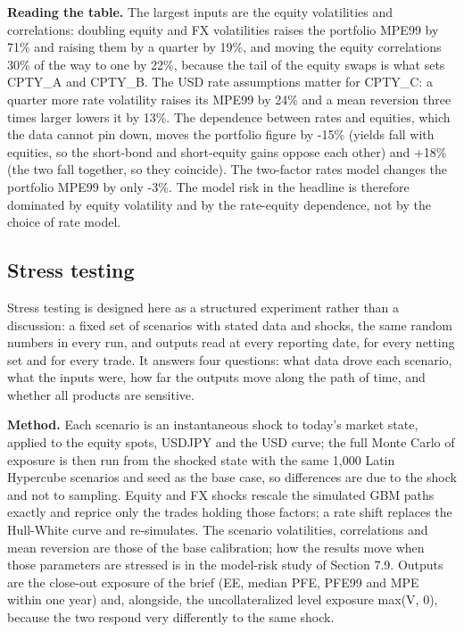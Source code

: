 \documentclass[11pt,letterpaper]{article}
\begin{document}
\textbf{Reading the table.} The largest inputs are the equity volatilities and correlations: doubling equity and FX volatilities raises the portfolio MPE99 by 71\% and raising them by a quarter by 19\%, and moving the equity correlations 30\% of the way to one by 22\%, because the tail of the equity swaps is what sets CPTY\_A and CPTY\_B. The USD rate assumptions matter for CPTY\_C: a quarter more rate volatility raises its MPE99 by 24\% and a mean reversion three times larger lowers it by 13\%. The dependence between rates and equities, which the data cannot pin down, moves the portfolio figure by -15\% (yields fall with equities, so the short-bond and short-equity gains oppose each other) and +18\% (the two fall together, so they coincide). The two-factor rates model changes the portfolio MPE99 by only -3\%. The model risk in the headline is therefore dominated by equity volatility and by the rate-equity dependence, not by the choice of rate model.

\subsection{Stress testing}
Stress testing is designed here as a structured experiment rather than a discussion: a fixed set of scenarios with stated data and shocks, the same random numbers in every run, and outputs read at every reporting date, for every netting set and for every trade. It answers four questions: what data drove each scenario, what the inputs were, how far the outputs move along the path of time, and whether all products are sensitive.

\textbf{Method.} Each scenario is an instantaneous shock to today's market state, applied to the equity spots, USDJPY and the USD curve; the full Monte Carlo of exposure is then run from the shocked state with the same 1,000 Latin Hypercube scenarios and seed as the base case, so differences are due to the shock and not to sampling. Equity and FX shocks rescale the simulated GBM paths exactly and reprice only the trades holding those factors; a rate shift replaces the Hull-White curve and re-simulates. The scenario volatilities, correlations and mean reversion are those of the base calibration; how the results move when those parameters are stressed is in the model-risk study of Section 7.9. Outputs are the close-out exposure of the brief (EE, median PFE, PFE99 and MPE within one year) and, alongside, the uncollateralized level exposure max(V, 0), because the two respond very differently to the same shock.
\end{document}
